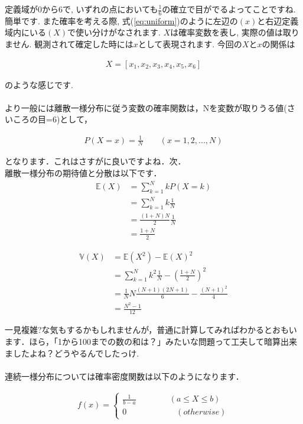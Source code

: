 \documentclass[11pt,a4paper,uplatex]{ujreport} 	%
\begin{document}
定義域が0から6で, いずれの点においても$\frac{1}{6}$の確立で目がでるよってことですね. 簡単です. また確率を考える際, 式(\ref{eq:uniform})のように左辺の$(x)$と右辺定義域内にいる$(X)$で使い分けがなされます. $X$は確率変数を表し, 実際の値は取りません. 観測されて確定した時には$x$として表現されます. 今回の$X$と$x$の関係は

\begin{align}
X = [x_1, x_2, x_3, x_4, x_5, x_6]
\end{align}

のような感じです. \\
\\

より一般には離散一様分布に従う変数の確率関数は，Nを変数が取りうる値(さいころの目=6)として，

\begin{align}
P(X=x) = \frac{1}{N} \qquad (x=1,2,...,N)
\end{align}

となります．これはさすがに良いですよね．次．\\

離散一様分布の期待値と分散は以下です．\\

\begin{align}
\mathbb{E}(X) &= \sum_{k=1}^N{kP(X=k)}\\
&=\sum_{k=1}^N{k\frac{1}{N}}\\
&= \frac{(1+N)N}{2}\frac{1}{N}\\
&= \frac{1+N}{2}
\end{align}

\begin{align}
\mathbb{V}(X) &= \mathbb{E}(X^2) - \mathbb{E}(X)^2\\
&= \sum_{k=1}^N k^2 \frac{1}{N} - {(\frac{1+N}{2})}^2\\
&= \frac{1}{N}N\frac{(N+1)(2N+1)}{6}-\frac{(N+1)^2}{4}\\
&= \frac{N^2-1}{12}
\end{align}

一見複雑?な気もするかもしれませんが，普通に計算してみればわかるとおもいます．ほら，「1から100までの数の和は？」みたいな問題って工夫して暗算出来ましたよね？どうやるんでしたっけ.\\
\\

連続一様分布については確率密度関数は以下のようになります．

\begin{align}
f(x) = 
\left\{
    \begin{array}{l}
      \frac{1}{b-a} \qquad \qquad  (a \leq X \leq b) \\
      0  \qquad \qquad \qquad(otherwise)
    \end{array}
  \right.
\end{align}
\end{document}
